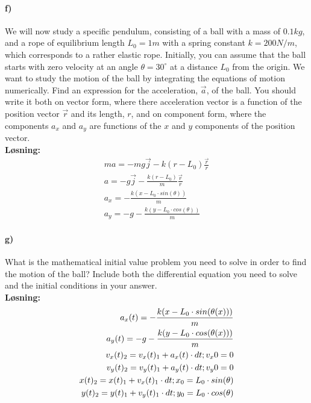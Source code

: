 \documentclass[11pt, A4paper,norsk]{article}
\begin{document}
		\paragraph{f)}
			\begin{flushleft}
We will now study a specific pendulum, consisting of a ball with a mass of $0.1kg$, and a rope of equilibrium length $L_0 = 1m$ with a spring constant $k = 200N/m$, which corresponds to a rather elastic rope. Initially, you can assume that the ball starts with zero velocity at an angle $\theta = 30^{\circ}$ at a distance $L_0$ from the origin. We want to study the motion of the ball by integrating the equations of motion numerically. \linebreak
Find an expression for the acceleration, $\vec{a}$, of the ball. You should write it both on vector form, where there acceleration vector is a function of the position vector $\vec{r}$ and its length, $r$, and on component form, where the components $a_x$ and $a_y$ are functions of the $x$ and $y$ components of the position vector. \\
\vspace{1mm}
\textbf{Løsning:} \\
\vspace{1mm}
				\begin{align}
ma = -mg\vec{j} - k(r - L_0)\frac{\vec{r}}{r} \\
a = -g\vec{j} - \frac{k(r - L_0)}{m}\frac{\vec{r}}{r} \\
a_x = - \frac{k(x - L_0 \cdot sin(\theta))}{m} \\
a_y = -g - \frac{k(y - L_0 \cdot cos(\theta))}{m}
				\end{align}
			\end{flushleft}
		\paragraph{g)}
			\begin{flushleft}
What is the mathematical initial value problem you need to solve in order to find the motion of the ball? Include both the differential equation you need to solve and the initial conditions in your answer. \\
\vspace{1mm}
\textbf{Løsning:} \\
\vspace{1mm}
				\begin{align}
a_x(t) = -\frac{k(x - L_0 \cdot sin(\theta(x)))}{m} \\
a_y(t) = -g -\frac{k(y - L_0 \cdot cos(\theta(x)))}{m} \\
v_x(t)_2 = v_x(t)_1 + a_x(t) \cdot dt \space; v_x0 = 0 \\
v_y(t)_2 = v_y(t)_1 + a_y(t) \cdot dt \space; v_y0 = 0 \\
x(t)_2 = x(t)_1 + v_x(t)_1 \cdot dt \space; x_0 = L_0 \cdot sin(\theta) \\
y(t)_2 = y(t)_1 + v_y(t)_1 \cdot dt \space; y_0 = L_0 \cdot cos(\theta)
				\end{align}	
			\end{flushleft}
\end{document}

